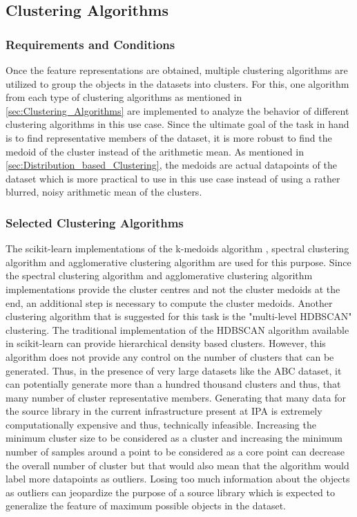 \subsection{Clustering Algorithms}

\subsubsection{Requirements and Conditions}
\label{sec:clustering_algo}
Once the feature representations are obtained, multiple clustering algorithms are utilized to group the objects in the datasets into clusters. For this, one algorithm from each type of clustering algorithms as mentioned in \ref{sec:Clustering_Algorithms} are implemented to analyze the behavior of different clustering algorithms in this use case. Since the ultimate goal of the task in hand is to find representative members of the dataset, it is more robust to find the medoid of the cluster instead of the arithmetic mean. As mentioned in \ref{sec:Distribution_based_Clustering}, the medoids are actual datapoints of the dataset which is more practical to use in this use case instead of using a rather blurred, noisy arithmetic mean of the clusters. 

\subsubsection{Selected Clustering Algorithms}
The scikit-learn implementations of the k-medoids algorithm \cite{scikit_learn_kmedoids}, spectral clustering algorithm \cite{scikit-learn} and agglomerative clustering algorithm \cite{scikit-learn} are used for this purpose. Since the spectral clustering algorithm and agglomerative clustering algorithm implementations provide the cluster centres and not the cluster medoids at the end, an additional step is necessary to compute the cluster medoids. Another clustering algorithm that is suggested for this task is the "multi-level \ac{HDBSCAN}" clustering. The traditional implementation of the \ac{HDBSCAN} algorithm available in scikit-learn can provide hierarchical density based clusters. However, this algorithm does not provide any control on the number of clusters that can be generated. Thus, in the presence of very large datasets like the ABC \cite{Koch_2019_CVPR} dataset, it can potentially generate more than a hundred thousand clusters and thus, that many number of cluster representative members. Generating that many data for the source library in the current infrastructure present at \ac{IPA} is extremely computationally expensive and thus, technically infeasible. Increasing the minimum cluster size to be considered as a cluster and increasing the minimum number of samples around a point to be considered as a core point can decrease the overall number of cluster but that would also mean that the algorithm would label more datapoints as outliers. Losing too much information about the objects as outliers can jeopardize the purpose of a source library which is expected to generalize the feature of maximum possible objects in the dataset. 

